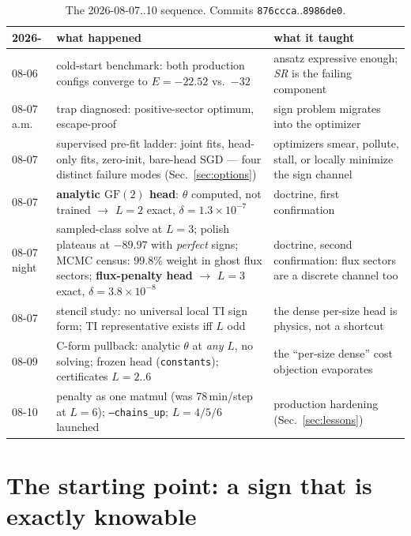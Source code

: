\documentclass[11pt]{article}
\newcommand{\GF}{\mathrm{GF}(2)}
\begin{document}
\begin{table}[h]
\centering\small
\begin{tabular}{@{}p{}p{}p{}@{}}
\toprule
2026- & what happened & what it taught \\
\midrule
08-06 & cold-start benchmark: both production configs converge to
$E=-22.52$ vs.\ $-32$ & ansatz expressive enough; \emph{SR} is the failing
component \\
08-07 a.m. & trap diagnosed: positive-sector optimum, escape-proof
\cite{SignNote} & sign problem migrates into the optimizer \\
08-07 & supervised pre-fit ladder: joint fits, head-only fits, zero-init,
bare-head SGD --- four distinct failure modes (Sec.~\ref{sec:options}) &
optimizers smear, pollute, stall, or locally minimize the sign channel \\
08-07 & \textbf{analytic $\GF$ head}: $\theta$ computed, not trained
$\to$ $L=2$ exact, $\delta=1.3\times10^{-7}$ & doctrine, first confirmation \\
08-07 night & sampled-class solve at $L=3$; polish plateaus at $-89.97$ with
\emph{perfect} signs; MCMC census: 99.8\% weight in ghost flux sectors;
\textbf{flux-penalty head} $\to$ $L=3$ exact, $\delta=3.8\times10^{-8}$ &
doctrine, second confirmation: flux sectors are a discrete channel too \\
08-07 & stencil study: no universal local TI sign form; TI representative
exists iff $L$ odd & the dense per-size head is physics, not a shortcut \\
08-09 & C-form pullback: analytic $\theta$ at \emph{any} $L$, no solving;
frozen head (\texttt{constants}); certificates $L=2..6$ & the ``per-size
dense'' cost objection evaporates \\
08-10 & penalty as one matmul (was 78\,min/step at $L=6$);
\texttt{--chains\_up}; $L=4/5/6$ launched & production hardening
(Sec.~\ref{sec:lessons}) \\
\bottomrule
\end{tabular}
\caption{The 2026-08-07..10 sequence. Commits \texttt{876ccca}..\texttt{8986de0}.}
\label{tab:timeline}
\end{table}

\section{The starting point: a sign that is exactly knowable}
\label{sec:start}
\end{document}
